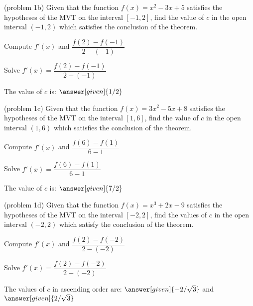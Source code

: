 \documentclass{ximera}
\begin{document}
\begin{problem}(problem 1b)
  Given that the function $f(x) = x^2 -3x + 5$ satisfies the hypotheses of the MVT on the
	interval $[-1,2]$, find the value of $c$ in the open interval $(-1,2)$ which satisfies 
	the conclusion of the theorem.
	
    \begin{hint}
      Compute $f'(x)$ and $\dfrac{f(2) - f(-1)}{2-(-1)}$
    \end{hint}
		\begin{hint}
		  Solve $f'(x) = \dfrac{f(2) - f(-1)}{2-(-1)}$
		\end{hint}
		
		The value of $c$ is:
		 $\answer[given]{1/2}$
\end{problem}

\begin{problem}(problem 1c)
  Given that the function $f(x) = 3x^2 -5x + 8$ satisfies the hypotheses of the MVT on the
	interval $[1,6]$, find the value of $c$ in the open interval $(1,6)$ which satisfies 
	the conclusion of the theorem.
	
    \begin{hint}
      Compute $f'(x)$ and $\dfrac{f(6) - f(1)}{6-1}$
    \end{hint}
		\begin{hint}
		  Solve $f'(x) = \dfrac{f(6) - f(1)}{6-1}$
		\end{hint}
		
		The value of $c$ is:
		 $\answer[given]{7/2}$
\end{problem}

\begin{problem}(problem 1d)
  Given that the function $f(x) = x^3 + 2x -9$ satisfies the hypotheses of the MVT on the
	interval $[-2,2]$, find the values of $c$ in the open interval $(-2,2)$ which satisfy 
	the conclusion of the theorem.
	
    \begin{hint}
      Compute $f'(x)$ and $\dfrac{f(2) - f(-2)}{2-(-2)}$
    \end{hint}
		\begin{hint}
		  Solve $f'(x) = \dfrac{f(2) - f(-2)}{2-(-2)}$
		\end{hint}
		
		The values of $c$ in ascending order are:
		 $\answer[given]{-2/\sqrt 3}$ and $\answer[given]{2/\sqrt 3}$
\end{problem}
\end{document}

